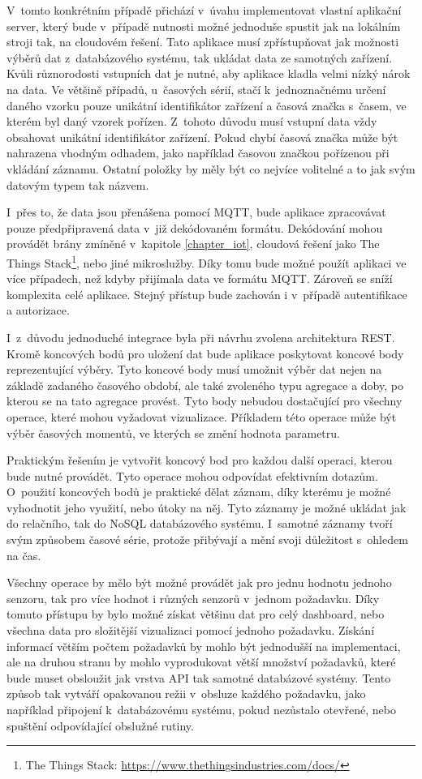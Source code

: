 V~tomto konkrétním případě přichází v~úvahu implementovat vlastní aplikační server, který bude v~případě nutnosti možné jednoduše spustit jak na lokálním stroji tak, na cloudovém řešení. Tato aplikace musí zpřístupňovat jak možnosti výběrů dat z~databázového systému, tak ukládat data ze samotných zařízení. Kvůli různorodosti vstupních dat je nutné, aby aplikace kladla velmi nízký nárok na data. Ve většině případů, u~časových sérií, stačí k~jednoznačnému určení daného vzorku pouze unikátní identifikátor zařízení a časová značka s~časem, ve kterém byl daný vzorek pořízen. Z~tohoto důvodu musí vstupní data vždy obsahovat unikátní identifikátor zařízení. Pokud chybí časová značka může být nahrazena vhodným odhadem, jako například časovou značkou pořízenou při vkládání záznamu. Ostatní položky by měly být co nejvíce volitelné a to jak svým datovým typem tak názvem. 

I~přes to, že data jsou přenášena pomocí MQTT, bude aplikace zpracovávat pouze předpřipravená data v~již dekódovaném formátu. Dekódování mohou provádět brány zmíněné v~kapitole \ref{chapter_iot}, cloudová řešení jako The Things Stack\footnote{The Things Stack: \url{https://www.thethingsindustries.com/docs/}}, nebo jiné mikroslužby. Díky tomu bude možné použít aplikaci ve více případech, než kdyby přijímala data ve formátu MQTT. Zároveň se sníží komplexita celé aplikace. Stejný přístup bude zachován i v~případě autentifikace a autorizace.

I~z~důvodu jednoduché integrace byla při návrhu zvolena architektura REST. Kromě koncových bodů pro uložení dat bude aplikace poskytovat koncové body reprezentující výběry. Tyto koncové body musí umožnit výběr dat nejen na základě zadaného časového období, ale také zvoleného typu agregace a doby, po kterou se na tato agregace provést. Tyto body nebudou dostačující pro všechny operace, které mohou vyžadovat vizualizace. Příkladem této operace může být výběr časových momentů, ve kterých se změní hodnota parametru.

Praktickým řešením je vytvořit koncový bod pro každou další operaci, kterou bude nutné provádět. Tyto operace mohou odpovídat efektivním dotazům. O~použití koncových bodů je praktické dělat záznam, díky kterému je možné vyhodnotit jeho využití, nebo útoky na něj. Tyto záznamy je možné ukládat jak do relačního, tak do NoSQL databázového systému. I~samotné záznamy tvoří svým způsobem časové série, protože přibývají a mění svoji důležitost s~ohledem na čas.

Všechny operace by mělo být možné provádět jak pro jednu hodnotu jednoho senzoru, tak pro více hodnot i různých senzorů v~jednom požadavku. Díky tomuto přístupu by bylo možné získat většinu dat pro celý dashboard, nebo všechna data pro složitější vizualizaci pomocí jednoho požadavku. Získání informací větším počtem požadavků by mohlo být jednodušší na implementaci, ale na druhou stranu by mohlo vyprodukovat větší množství požadavků, které bude muset obsloužit jak vrstva API tak samotné databázové systémy. Tento způsob tak vytváří opakovanou režii v~obsluze každého požadavku, jako například připojení k~databázovému systému, pokud nezůstalo otevřené, nebo spuštění odpovídající obslužné rutiny.

